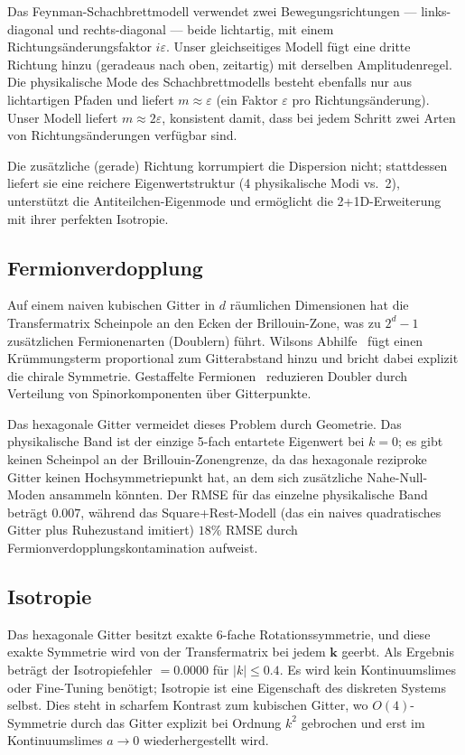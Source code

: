 \documentclass[twocolumn,showpacs,preprintnumbers,amsmath,amssymb]{revtex4-2}
\newcommand{\eps}{\varepsilon}
\begin{document}
Das Feynman-Schachbrettmodell verwendet zwei Bewegungsrichtungen ---
links-diagonal und rechts-diagonal --- beide lichtartig, mit einem
Richtungsänderungsfaktor $i\eps$.
Unser gleichseitiges Modell fügt eine dritte Richtung hinzu (geradeaus nach
oben, zeitartig) mit derselben Amplitudenregel.
Die physikalische Mode des Schachbrettmodells besteht ebenfalls nur aus
lichtartigen Pfaden und liefert $m \approx \eps$ (ein Faktor $\eps$ pro
Richtungsänderung).
Unser Modell liefert $m \approx 2\eps$, konsistent damit, dass bei jedem
Schritt zwei Arten von Richtungsänderungen verfügbar sind.

Die zusätzliche (gerade) Richtung korrumpiert die Dispersion nicht; stattdessen
liefert sie eine reichere Eigenwertstruktur (4 physikalische Modi vs.\ 2),
unterstützt die Antiteilchen-Eigenmode und ermöglicht die 2+1D-Erweiterung
mit ihrer perfekten Isotropie.

\subsection{Fermionverdopplung}

Auf einem naiven kubischen Gitter in $d$ räumlichen Dimensionen hat die
Transfermatrix Scheinpole an den Ecken der Brillouin-Zone, was zu
$2^d - 1$ zusätzlichen Fermionenarten (Doublern) führt.
Wilsons Abhilfe~\cite{wilson1974} fügt einen Krümmungsterm proportional zum
Gitterabstand hinzu und bricht dabei explizit die chirale Symmetrie.
Gestaffelte Fermionen~\cite{susskind1977} reduzieren Doubler durch Verteilung
von Spinorkomponenten über Gitterpunkte.

Das hexagonale Gitter vermeidet dieses Problem durch Geometrie.
Das physikalische Band ist der einzige 5-fach entartete Eigenwert bei $k = 0$;
es gibt keinen Scheinpol an der Brillouin-Zonengrenze, da das hexagonale
reziproke Gitter keinen Hochsymmetriepunkt hat, an dem sich zusätzliche
Nahe-Null-Moden ansammeln könnten.
Der RMSE für das einzelne physikalische Band beträgt $0.007$, während das
Square+Rest-Modell (das ein naives quadratisches Gitter plus Ruhezustand
imitiert) $18\%$ RMSE durch Fermionverdopplungskontamination aufweist.

\subsection{Isotropie}

Das hexagonale Gitter besitzt exakte 6-fache Rotationssymmetrie, und diese
exakte Symmetrie wird von der Transfermatrix bei jedem $\mathbf{k}$ geerbt.
Als Ergebnis beträgt der Isotropiefehler $= 0.0000$ für $|k| \le 0.4$.
Es wird kein Kontinuumslimes oder Fine-Tuning benötigt; Isotropie ist eine
Eigenschaft des diskreten Systems selbst.
Dies steht in scharfem Kontrast zum kubischen Gitter, wo $O(4)$-Symmetrie
durch das Gitter explizit bei Ordnung $k^2$ gebrochen und erst im
Kontinuumslimes $a \to 0$ wiederhergestellt wird.
\end{document}
